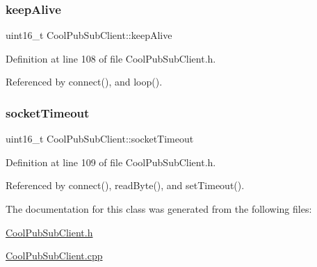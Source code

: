 \mbox{\label{class_cool_pub_sub_client_a653f086eb3a039c08116bb828e35f7c1}} 
\subsubsection{\texorpdfstring{keep\+Alive}{keepAlive}}
{\footnotesize\ttfamily uint16\+\_\+t Cool\+Pub\+Sub\+Client\+::keep\+Alive\hspace{0.3cm}{\ttfamily [private]}}



Definition at line 108 of file Cool\+Pub\+Sub\+Client.\+h.



Referenced by connect(), and loop().

\mbox{\label{class_cool_pub_sub_client_a2d7b7c7dda1313ff1492b158c3712630}} 
\subsubsection{\texorpdfstring{socket\+Timeout}{socketTimeout}}
{\footnotesize\ttfamily uint16\+\_\+t Cool\+Pub\+Sub\+Client\+::socket\+Timeout\hspace{0.3cm}{\ttfamily [private]}}



Definition at line 109 of file Cool\+Pub\+Sub\+Client.\+h.



Referenced by connect(), read\+Byte(), and set\+Timeout().



The documentation for this class was generated from the following files\+:\begin{DoxyCompactItemize}
\item 
\hyperlink{_cool_pub_sub_client_8h}{Cool\+Pub\+Sub\+Client.\+h}\item 
\hyperlink{_cool_pub_sub_client_8cpp}{Cool\+Pub\+Sub\+Client.\+cpp}\end{DoxyCompactItemize}
